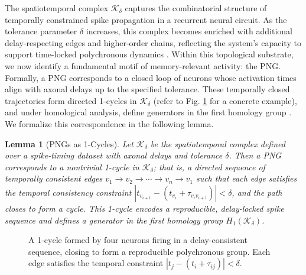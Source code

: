 \documentclass[lettersize,journal]{IEEEtran}
\newtheorem{lemma}{Lemma}
\begin{document}
The spatiotemporal complex \( \mathcal{K}_\delta \) captures the combinatorial structure of temporally constrained spike propagation in a recurrent neural circuit. As the tolerance parameter \( \delta \) increases, this complex becomes enriched with additional delay-respecting edges and higher-order chains, reflecting the system's capacity to support time-locked polychronous dynamics \cite{izhikevich2006polychronization}. Within this topological substrate, we now identify a fundamental motif of memory-relevant activity: the PNG. Formally, a PNG corresponds to a closed loop of neurons whose activation times align with axonal delays up to the specified tolerance. These temporally closed trajectories form directed 1-cycles in \( \mathcal{K}_\delta \) (refer to Fig. \ref{fig:1-cyle} for a concrete example), and under homological analysis, define generators in the first homology group \cite{giusti2015clique}. We formalize this correspondence in the following lemma.


\begin{lemma}[PNGs as 1-Cycles]
Let \( \mathcal{K}_\delta \) be the spatiotemporal complex defined over a spike-timing dataset with axonal delays and tolerance \( \delta \). Then a \emph{PNG} corresponds to a nontrivial 1-cycle in \( \mathcal{K}_\delta \); that is, a directed sequence of temporally consistent edges
$v_1 \rightarrow v_2 \rightarrow \cdots \rightarrow v_n \rightarrow v_1$
such that each edge satisfies the temporal consistency constraint
$|t_{v_{i+1}} - (t_{v_i} + \tau_{v_i v_{i+1}})| < \delta$,
and the path closes to form a cycle. This 1-cycle encodes a reproducible, delay-locked spike sequence and defines a generator in the first homology group \( H_1(\mathcal{K}_\delta) \).
\label{lemma:PNG}
\end{lemma}

\begin{figure}[h]
\centering
{}
\caption{A 1-cycle formed by four neurons firing in a delay-consistent sequence, closing to form a reproducible polychronous group. Each edge satisfies the temporal constraint \( |t_j - (t_i + \tau_{ij})| < \delta \).}
\label{fig:1-cyle}
\end{figure}
\end{document}
